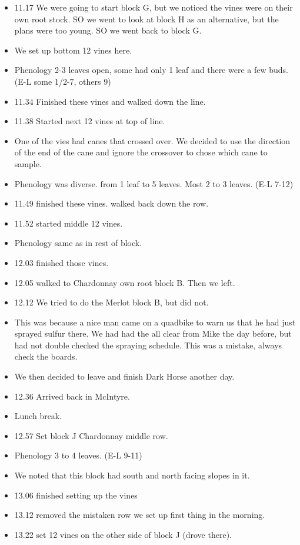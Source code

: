 \documentclass[11pt,letter]{article}
\newenvironment{smitemize}{
\begin{itemize}
  \setlength{\itemsep}{0pt}
  \setlength{\parskip}{0.8pt}
  \setlength{\parsep}{0pt}}
{\end{itemize}
}
\begin{document}
\begin{smitemize}
\item 11.17 We were going to start block G, but we noticed the vines were on their own root stock. SO we went to look at block H as an alternative, but the plans were too young. SO we went back to block G. 
\item We set up bottom 12 vines here.
\item Phenology 2-3 leaves open, some had only 1 leaf and there were a few buds. (E-L some 1/2-7, others 9)
\item 11.34 Finished these vines and walked down the line.
\item 11.38 Started next 12 vines at top of line. 
\item One of the vies had canes that crossed over. We decided to use the direction of the end of the cane and ignore the crossover to chose which cane to sample. 
\item Phenology was diverse. from 1 leaf to 5 leaves. Most 2 to 3 leaves. (E-L 7-12)
\item 11.49 finished these vines. walked back down the row. 
\item 11.52 started middle 12 vines. 
\item Phenology same as in rest of block. 
\item 12.03 finished those vines. 
\item 12.05 walked to Chardonnay own root block B. Then we left.
\item 12.12 We tried to do the Merlot block B, but did not. 
\item This was because a nice man came on a quadbike to warn us that he had just sprayed sulfur there. We had had the all clear from Mike the day before, but had not double checked the spraying schedule. This was a mistake, always check the boards.
\item We then decided to leave and finish Dark Horse another day. 
\item 12.36 Arrived back in McIntyre.
\item Lunch break.
\item 12.57 Set block J Chardonnay middle row.
\item Phenology 3 to 4 leaves. (E-L 9-11) 
\item We noted that this block had south and north facing slopes in it.
\item 13.06 finished setting up the vines 
\item 13.12 removed the mistaken row we set up first thing in the morning.
\item 13.22 set 12 vines on the other side of block J (drove there).

\end{smitemize}
\end{document}
